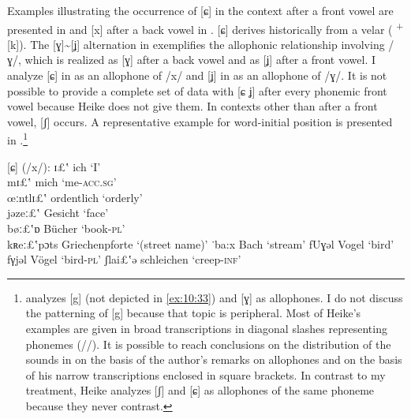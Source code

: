\begin{xlist}
Examples illustrating the occurrence of [ɕ] in the context after a front vowel are presented in  and [x] after a back vowel in . [ɕ] derives historically from a velar ( \textsuperscript{+}[k]). The [ɣ]{\textasciitilde}[ʝ] alternation in  exemplifies the allophonic relationship involving /ɣ/, which is realized as [ɣ] after a back vowel and as [ʝ] after a front vowel. I analyze [ɕ] in  as an allophone of /x/ and [ʝ] in  as an allophone of /ɣ/. It is not possible to provide a complete set of data with [ɕ ʝ] after every phonemic front vowel because Heike does not give them. In contexts other than after a front vowel, [ʃ] occurs. A representative example for word-initial position is presented in .\footnote{{\citet[46]{Heike1964} analyzes [g] (not depicted in \ref{ex:10:33}) and [ɣ] as allophones. I do not discuss the patterning of [g] because that topic is peripheral. Most of Heike’s examples are given in broad transcriptions in diagonal slashes representing phonemes (//). It is possible to reach conclusions on the distribution of the sounds in  on the basis of the author’s remarks on allophones and on the basis of his narrow transcriptions enclosed in square brackets. In contrast to my treatment, Heike analyzes [ʃ] and [ɕ] as allophones of the same phoneme because they never contrast.} }

\ea%
\label{ex:10:34} [ɕ] (/x/):
\ea\label{ex:10:34a} ɪ£ʽ \tab  [ɪɕ] \tab ich \tab ‘I’ \\
    mɪ£ʽ \tab [mɪɕ] \tab mich \tab ‘me-\textsc{acc}.\textsc{sg}’ \\
    œːntlɪ£ʽ \tab [œːntlɪɕ] \tab ordentlich \tab ‘orderly’ \\
    jǝzeː£ʽ \tab [ʝǝzeːɕ] \tab Gesicht \tab ‘face’ \\
    bøː£ʽɒ \tab [bøːɕɒ] \tab Bücher \tab ‘book-\textsc{pl}’ \\
    kʀeː£ʽpɔts \tab [kʀeːɕpɔts] \tab Griechenpforte \tab ‘(street name)’ 
\ex\label{ex:10:34b} ˙ba:x \tab [bɑːx] \tab Bach \tab ‘stream’ 
\ex\label{ex:10:34c} fUɣǝl \tab [fʊɣǝl] \tab Vogel \tab ‘bird’ \\
    fγjǝl \tab [fʏʝǝl] \tab Vögel \tab ‘bird-\textsc{pl}’ 
\ex\label{ex:10:34d} ʃlai£ʽǝ \tab [ʃlaiɕǝ] \tab schleichen \tab ‘creep\textsc{{}-inf}’ 
    \z
\z 


\end{xlist}
